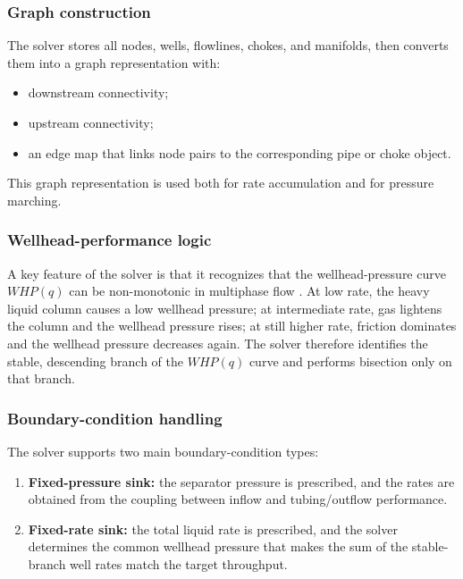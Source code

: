\subsubsection*{Graph construction}

The solver stores all nodes, wells, flowlines, chokes, and manifolds, then
converts them into a graph representation with:

\begin{itemize}
    \item downstream connectivity;
    \item upstream connectivity;
    \item an edge map that links node pairs to the corresponding pipe or choke
          object.
\end{itemize}

This graph representation is used both for rate accumulation and for pressure
marching.

\subsubsection*{Wellhead-performance logic}

A key feature of the solver is that it recognizes that the wellhead-pressure
curve $WHP(q)$ can be non-monotonic in multiphase flow \cite{BeggsBrill1973}.
At low rate, the heavy liquid column causes a low wellhead pressure; at
intermediate rate, gas lightens the column and the wellhead pressure rises; at
still higher rate, friction dominates and the wellhead pressure decreases again.
The solver therefore identifies the stable, descending branch of the $WHP(q)$
curve and performs bisection only on that branch.

\subsubsection*{Boundary-condition handling}

The solver supports two main boundary-condition types:

\begin{enumerate}
    \item \textbf{Fixed-pressure sink:} the separator pressure is prescribed,
          and the rates are obtained from the coupling between inflow and
          tubing/outflow performance.
    \item \textbf{Fixed-rate sink:} the total liquid rate is prescribed, and
          the solver determines the common wellhead pressure that makes the sum
          of the stable-branch well rates match the target throughput.
\end{enumerate}

